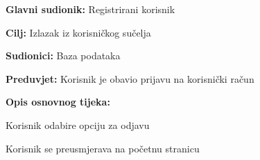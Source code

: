 \noindent {}
\begin{packed_item}

	\item \textbf{Glavni sudionik: }Registrirani korisnik
	\item  \textbf{Cilj:} Izlazak iz korisničkog sučelja
	\item  \textbf{Sudionici:} Baza podataka
	\item  \textbf{Preduvjet:} Korisnik je obavio prijavu na korisnički račun
	\item  \textbf{Opis osnovnog tijeka:}

	\item[] \begin{packed_enum}

		\item Korisnik odabire opciju za odjavu
		\item Korisnik se preusmjerava na početnu stranicu
	\end{packed_enum}
\end{packed_item}


